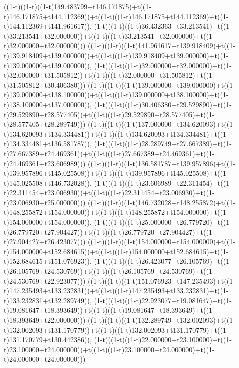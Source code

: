 ((1-t)((1-t)((1-t)149.483799+t146.171875)+t((1-t)146.171875+t144.112369))+t((1-t)((1-t)146.171875+t144.112369)+t((1-t)144.112369+t141.961617)),                                     (1-t)((1-t)((1-t)36.432363+t33.213541)+t((1-t)33.213541+t32.000000))+t((1-t)((1-t)33.213541+t32.000000)+t((1-t)32.000000+t32.000000)))
((1-t)((1-t)((1-t)141.961617+t139.918409)+t((1-t)139.918409+t139.000000))+t((1-t)((1-t)139.918409+t139.000000)+t((1-t)139.000000+t139.000000)),                                     (1-t)((1-t)((1-t)32.000000+t32.000000)+t((1-t)32.000000+t31.505812))+t((1-t)((1-t)32.000000+t31.505812)+t((1-t)31.505812+t30.406380)))
((1-t)((1-t)((1-t)139.000000+t139.000000)+t((1-t)139.000000+t138.100000))+t((1-t)((1-t)139.000000+t138.100000)+t((1-t)138.100000+t137.000000)),                                     (1-t)((1-t)((1-t)30.406380+t29.529890)+t((1-t)29.529890+t28.577405))+t((1-t)((1-t)29.529890+t28.577405)+t((1-t)28.577405+t28.289749)))
((1-t)((1-t)((1-t)137.000000+t134.620093)+t((1-t)134.620093+t134.334481))+t((1-t)((1-t)134.620093+t134.334481)+t((1-t)134.334481+t136.581787)),                                     (1-t)((1-t)((1-t)28.289749+t27.667389)+t((1-t)27.667389+t24.469361))+t((1-t)((1-t)27.667389+t24.469361)+t((1-t)24.469361+t23.606989)))
((1-t)((1-t)((1-t)136.581787+t139.957896)+t((1-t)139.957896+t145.025508))+t((1-t)((1-t)139.957896+t145.025508)+t((1-t)145.025508+t146.732028)),                                     (1-t)((1-t)((1-t)23.606989+t22.311454)+t((1-t)22.311454+t23.006930))+t((1-t)((1-t)22.311454+t23.006930)+t((1-t)23.006930+t25.000000)))
((1-t)((1-t)((1-t)146.732028+t148.255872)+t((1-t)148.255872+t154.000000))+t((1-t)((1-t)148.255872+t154.000000)+t((1-t)154.000000+t154.000000)),                                     (1-t)((1-t)((1-t)25.000000+t26.779720)+t((1-t)26.779720+t27.904427))+t((1-t)((1-t)26.779720+t27.904427)+t((1-t)27.904427+t26.423077)))
((1-t)((1-t)((1-t)154.000000+t154.000000)+t((1-t)154.000000+t152.684615))+t((1-t)((1-t)154.000000+t152.684615)+t((1-t)152.684615+t151.076923)),                                     (1-t)((1-t)((1-t)26.423077+t26.105769)+t((1-t)26.105769+t24.530769))+t((1-t)((1-t)26.105769+t24.530769)+t((1-t)24.530769+t22.923077)))
((1-t)((1-t)((1-t)151.076923+t147.235493)+t((1-t)147.235493+t133.232831))+t((1-t)((1-t)147.235493+t133.232831)+t((1-t)133.232831+t132.289749)),                                     (1-t)((1-t)((1-t)22.923077+t19.081647)+t((1-t)19.081647+t18.393649))+t((1-t)((1-t)19.081647+t18.393649)+t((1-t)18.393649+t22.000000)))
((1-t)((1-t)((1-t)132.289749+t132.002093)+t((1-t)132.002093+t131.170779))+t((1-t)((1-t)132.002093+t131.170779)+t((1-t)131.170779+t130.442386)),                                     (1-t)((1-t)((1-t)22.000000+t23.100000)+t((1-t)23.100000+t24.000000))+t((1-t)((1-t)23.100000+t24.000000)+t((1-t)24.000000+t24.000000)))
